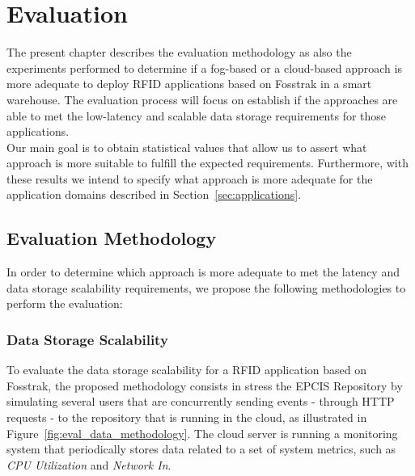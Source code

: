 
\chapter{Evaluation}
\label{chapter:evaluation}
The present chapter describes the evaluation methodology as also the experiments performed to determine
if a fog-based or a cloud-based approach is more adequate to deploy \gls{RFID} applications based on
Fosstrak in a smart warehouse. The evaluation process will focus on establish if the approaches are
able to met the low-latency and scalable data storage requirements for those applications.\\

Our main goal is to obtain statistical values that allow us to assert what approach is more suitable
to fulfill the expected requirements. Furthermore, with these results we intend to specify what
approach is more adequate for the application domains described in Section~\ref{sec:applications}.

\section{Evaluation Methodology}
\label{sec:eval_methodology}
In order to determine which approach is more adequate to met the latency and data storage scalability
requirements, we propose the following methodologies to perform the evaluation:

\subsection{Data Storage Scalability}
\label{sub:eval_methodology_data}
To evaluate the data storage scalability for a \gls{RFID} application based on Fosstrak, the proposed
methodology consists in stress the \gls{EPCIS} Repository by simulating several users that are
concurrently sending events - through \gls{HTTP} requests - to the repository that is
running in the cloud, as illustrated in Figure~\ref{fig:eval_data_methodology}. The cloud server is
running a monitoring system that periodically stores data related to a set of system metrics,
such as \textit{CPU Utilization} and \textit{Network In}.\\

